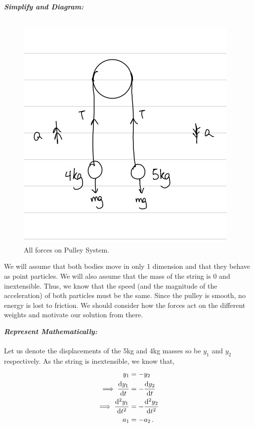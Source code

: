 \begin{subquestions}
\begin{subsubquestions}
	
	\textbf{\textit{Simplify and Diagram:}} \\ \\
	\begin{figure}[H]
		\begin{center}
			\includegraphics[scale=0.25]{../2011/figures/2011q5-2}
			\caption{\label{2011:q5:Diagram2} All forces on Pulley System.}
		\end{center}
	\end{figure}
	We will assume that both bodies move in only 1 dimension and that they behave as point particles. We will also assume that the mass of the string is 0 and inextensible. Thus, we know that the speed (and the magnitude of the acceleration) of both particles must be the same. Since the pulley is smooth, no energy is lost to friction. We should consider how the forces act on the different weights and motivate our solution from there.
	
	
	
	
	\textbf{\textit{Represent Mathematically:}} \\ \\ 
	Let us denote the displacements of the 5kg and 4kg masses so be $y_1$ and $y_2$ respectively. As the string is inextensible, we know that,
	\begin{align}
		y_1 & = -y_2 \nonumber \\
		\implies \frac{\mathrm{d}y_1}{\mathrm{d}t} & = -\frac{\mathrm{d}y_2}{\mathrm{d}t} \nonumber \\
		\implies \frac{\mathrm{d}^2y_1}{\mathrm{d}t^2} & = -\frac{\mathrm{d}^2y_2}{\mathrm{d}t^2} \nonumber \\
		a_1 & = -a_2 \,.
	\end{align}
	

\end{subsubquestions}
\end{subquestions}
